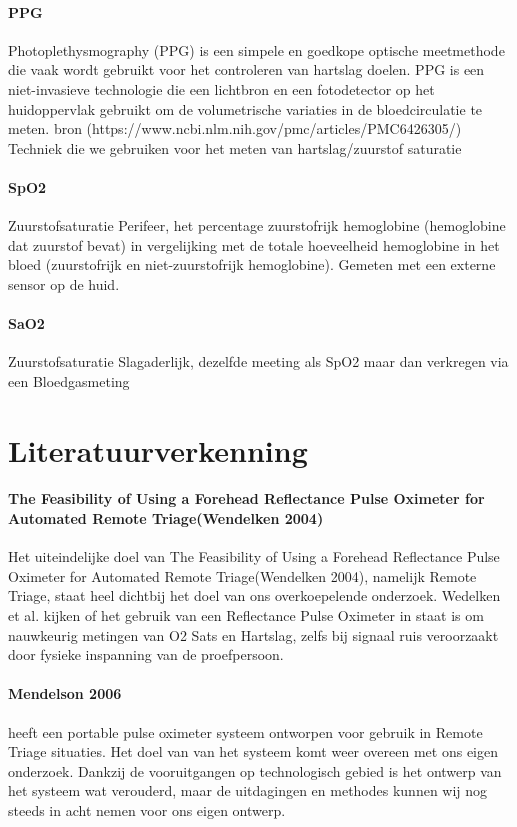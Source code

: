 \documentclass[11pt]{article}
\begin{document}
    \paragraph{PPG} 
    Photoplethysmography (PPG) is een simpele en goedkope optische meetmethode die vaak wordt gebruikt voor het controleren van hartslag doelen. 
    PPG is een niet-invasieve technologie die een lichtbron en een fotodetector op het huidoppervlak gebruikt om de volumetrische variaties in de bloedcirculatie te meten. 
    bron (https://www.ncbi.nlm.nih.gov/pmc/articles/PMC6426305/) Techniek die we gebruiken voor het meten van hartslag/zuurstof saturatie


    \paragraph{SpO2}
    Zuurstofsaturatie Perifeer,  het percentage zuurstofrijk hemoglobine (hemoglobine dat zuurstof bevat) in vergelijking met de totale hoeveelheid hemoglobine in het bloed (zuurstofrijk en niet-zuurstofrijk hemoglobine). 
    Gemeten met een externe sensor op de huid.

    \paragraph{SaO2} 
    Zuurstofsaturatie Slagaderlijk, dezelfde meeting als SpO2 maar dan verkregen via een Bloedgasmeting 


    \section{Literatuurverkenning}\label{sec:literatuur}
    \paragraph{The Feasibility of Using a Forehead Reflectance Pulse Oximeter for Automated Remote Triage(Wendelken 2004)}Het uiteindelijke doel van The Feasibility of Using a Forehead Reflectance Pulse Oximeter for Automated Remote Triage(Wendelken 2004), namelijk Remote Triage, staat heel dichtbij het doel van ons overkoepelende onderzoek. 
    Wedelken et al. kijken of het gebruik van een Reflectance Pulse Oximeter in staat is om nauwkeurig metingen van O2 Sats en Hartslag, zelfs bij signaal ruis veroorzaakt door fysieke inspanning van de proefpersoon.

    \paragraph{Mendelson 2006} heeft een portable pulse oximeter systeem ontworpen voor gebruik in Remote Triage situaties. 
    Het doel van van het systeem komt weer overeen met ons eigen onderzoek. 
    Dankzij de vooruitgangen op technologisch gebied is het ontwerp van het systeem wat verouderd, maar de uitdagingen en methodes kunnen wij nog steeds in acht nemen voor ons eigen ontwerp.
\end{document}
